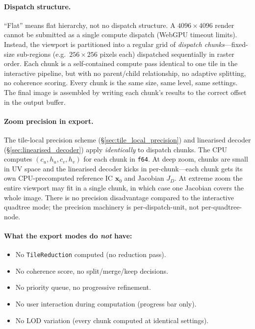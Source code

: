 \documentclass[11pt]{report}
\begin{document}
\paragraph{Dispatch structure.} ``Flat'' means flat hierarchy, not no dispatch structure. A $4096\times 4096$ render cannot be submitted as a single compute dispatch (WebGPU timeout limits). Instead, the viewport is partitioned into a regular grid of \emph{dispatch chunks}---fixed-size sub-regions (e.g.\ $256\times 256$ pixels each) dispatched sequentially in raster order. Each chunk is a self-contained compute pass identical to one tile in the interactive pipeline, but with no parent/child relationship, no adaptive splitting, no coherence scoring. Every chunk is the same size, same level, same settings. The final image is assembled by writing each chunk's results to the correct offset in the output buffer.

\paragraph{Zoom precision in export.} The tile-local precision scheme (\S\ref{sec:tile_local_precision}) and linearised decoder (\S\ref{sec:linearised_decoder}) apply \emph{identically} to dispatch chunks. The CPU computes $(c_u,h_u,c_v,h_v)$ for each chunk in \texttt{f64}. At deep zoom, chunks are small in UV space and the linearised decoder kicks in per-chunk---each chunk gets its own CPU-precomputed reference IC $\mathbf x_0$ and Jacobian $J_D$. At extreme zoom the entire viewport may fit in a single chunk, in which case one Jacobian covers the whole image. There is no precision disadvantage compared to the interactive quadtree mode; the precision machinery is per-dispatch-unit, not per-quadtree-node.

\paragraph{What the export modes do \emph{not} have:}
\begin{itemize}[nosep]
\item No \texttt{TileReduction} computed (no reduction pass).
\item No coherence score, no split/merge/keep decisions.
\item No priority queue, no progressive refinement.
\item No user interaction during computation (progress bar only).
\item No LOD variation (every chunk computed at identical settings).
\end{itemize}
\end{document}

